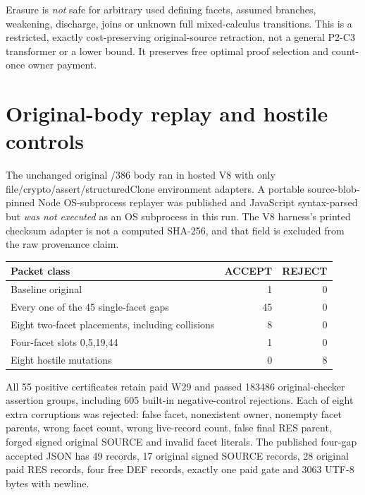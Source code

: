 \documentclass[11pt]{article}
\begin{document}
Erasure is \emph{not} safe for arbitrary used defining facets, assumed branches, weakening, discharge, joins or unknown full mixed-calculus transitions. This is a restricted, exactly cost-preserving original-source retraction, not a general P2-C3 transformer or a lower bound. It preserves free optimal proof selection and count-once owner payment.

\section*{Original-body replay and hostile controls}
The unchanged original /386 body ran in hosted V8 with only file/crypto/assert/structuredClone environment adapters. A portable source-blob-pinned Node OS-subprocess replayer was published and JavaScript syntax-parsed but \emph{was not executed} as an OS subprocess in this run. The V8 harness's printed checksum adapter is not a computed SHA-256, and that field is excluded from the raw provenance claim.
\begin{center}
\begin{tabular}{lrr}
\toprule
Packet class & ACCEPT & REJECT\\
\midrule
Baseline original & 1 & 0\\
Every one of the 45 single-facet gaps & 45 & 0\\
Eight two-facet placements, including collisions & 8 & 0\\
Four-facet slots 0,5,19,44 & 1 & 0\\
Eight hostile mutations & 0 & 8\\
\bottomrule
\end{tabular}
\end{center}
All 55 positive certificates retain paid W29 and passed 183486 original-checker assertion groups, including 605 built-in negative-control rejections. Each of eight extra corruptions was rejected: false facet, nonexistent owner, nonempty facet parents, wrong facet count, wrong live-record count, false final RES parent, forged signed original SOURCE and invalid facet literals. The published four-gap accepted JSON has 49 records, 17 original signed SOURCE records, 28 original paid RES records, four free DEF records, exactly one paid gate and 3063 UTF-8 bytes with newline.
\end{document}
